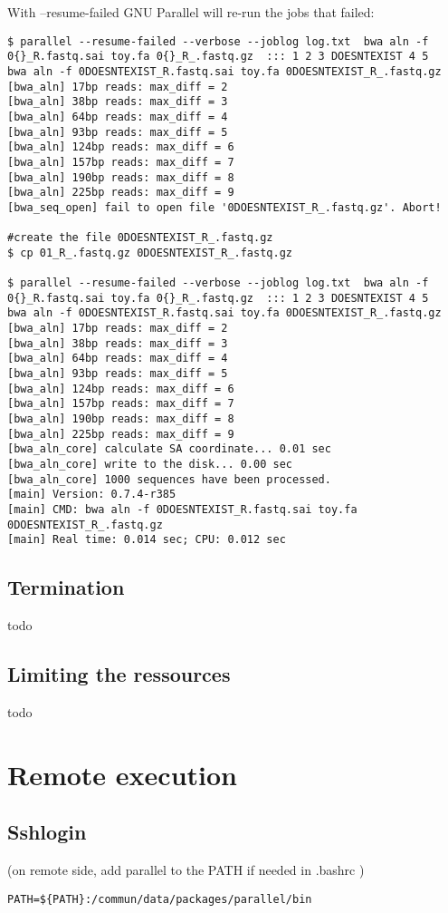 \documentclass{article}
\begin{document}
With --resume-failed GNU Parallel will re-run the jobs that failed:
\begin{lstlisting}
$ parallel --resume-failed --verbose --joblog log.txt  bwa aln -f 0{}_R.fastq.sai toy.fa 0{}_R_.fastq.gz  ::: 1 2 3 DOESNTEXIST 4 5
bwa aln -f 0DOESNTEXIST_R.fastq.sai toy.fa 0DOESNTEXIST_R_.fastq.gz
[bwa_aln] 17bp reads: max_diff = 2
[bwa_aln] 38bp reads: max_diff = 3
[bwa_aln] 64bp reads: max_diff = 4
[bwa_aln] 93bp reads: max_diff = 5
[bwa_aln] 124bp reads: max_diff = 6
[bwa_aln] 157bp reads: max_diff = 7
[bwa_aln] 190bp reads: max_diff = 8
[bwa_aln] 225bp reads: max_diff = 9
[bwa_seq_open] fail to open file '0DOESNTEXIST_R_.fastq.gz'. Abort!

#create the file 0DOESNTEXIST_R_.fastq.gz 
$ cp 01_R_.fastq.gz 0DOESNTEXIST_R_.fastq.gz

$ parallel --resume-failed --verbose --joblog log.txt  bwa aln -f 0{}_R.fastq.sai toy.fa 0{}_R_.fastq.gz  ::: 1 2 3 DOESNTEXIST 4 5
bwa aln -f 0DOESNTEXIST_R.fastq.sai toy.fa 0DOESNTEXIST_R_.fastq.gz
[bwa_aln] 17bp reads: max_diff = 2
[bwa_aln] 38bp reads: max_diff = 3
[bwa_aln] 64bp reads: max_diff = 4
[bwa_aln] 93bp reads: max_diff = 5
[bwa_aln] 124bp reads: max_diff = 6
[bwa_aln] 157bp reads: max_diff = 7
[bwa_aln] 190bp reads: max_diff = 8
[bwa_aln] 225bp reads: max_diff = 9
[bwa_aln_core] calculate SA coordinate... 0.01 sec
[bwa_aln_core] write to the disk... 0.00 sec
[bwa_aln_core] 1000 sequences have been processed.
[main] Version: 0.7.4-r385
[main] CMD: bwa aln -f 0DOESNTEXIST_R.fastq.sai toy.fa 0DOESNTEXIST_R_.fastq.gz
[main] Real time: 0.014 sec; CPU: 0.012 sec
\end{lstlisting}
\subsection{Termination}
todo

\subsection{Limiting the ressources}
todo

\section{Remote execution}
\subsection{Sshlogin}
(on remote side, add parallel to the PATH if needed in .bashrc )
\begin{lstlisting}
PATH=${PATH}:/commun/data/packages/parallel/bin
\end{lstlisting}
\end{document}
